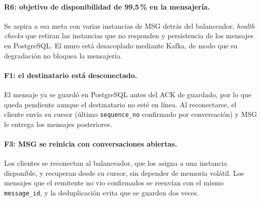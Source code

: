 \paragraph{R6: objetivo de disponibilidad de 99,5\,\% en la mensajería.}
Se aspira a esa meta con varias instancias de MSG detrás del balanceador, \emph{health
checks} que retiran las instancias que no responden y persistencia de los mensajes en
PostgreSQL. El muro está desacoplado mediante Kafka, de modo que su degradación no bloquea
la mensajería.

\paragraph{F1: el destinatario está desconectado.}
El mensaje ya se guardó en PostgreSQL antes del ACK de guardado, por lo que queda pendiente
aunque el destinatario no esté en línea. Al reconectarse, el cliente envía su cursor (último
\texttt{sequence\_no} confirmado por conversación) y MSG le entrega los mensajes posteriores.

\paragraph{F3: MSG se reinicia con conversaciones abiertas.}
Los clientes se reconectan al balanceador, que los asigna a una instancia disponible, y
recuperan desde su cursor, sin depender de memoria volátil. Los mensajes que el remitente no
vio confirmados se reenvían con el mismo \texttt{message\_id}, y la deduplicación evita que
se guarden dos veces.
